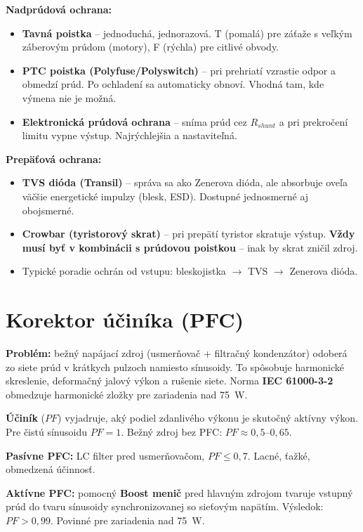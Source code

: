\textbf{Nadprúdová ochrana:}
\begin{itemize}
    \item \textbf{Tavná poistka} -- jednoduchá, jednorazová. T (pomalá) pre záťaže s veľkým záberovým prúdom (motory), F (rýchla) pre citlivé obvody.
    \item \textbf{PTC poistka (Polyfuse/Polyswitch)} -- pri prehriatí vzrastie odpor a obmedzí prúd. Po ochladení sa automaticky obnoví. Vhodná tam, kde výmena nie je možná.
    \item \textbf{Elektronická prúdová ochrana} -- sníma prúd cez $R_{shunt}$ a pri prekročení limitu vypne výstup. Najrýchlejšia a nastaviteľná.
\end{itemize}

\textbf{Prepäťová ochrana:}
\begin{itemize}
    \item \textbf{TVS dióda (Transil)} -- správa sa ako Zenerova dióda, ale absorbuje oveľa väčšie energetické impulzy (blesk, ESD). Dostupné jednosmerné aj obojsmerné.
    \item \textbf{Crowbar (tyristorový skrat)} -- pri prepätí tyristor skratuje výstup. \textbf{Vždy musí byť v kombinácii s prúdovou poistkou} -- inak by skrat zničil zdroj.
    \item Typické poradie ochrán od vstupu: bleskojistka $\to$ TVS $\to$ Zenerova dióda.
\end{itemize}

\section{Korektor účiníka (PFC)}

\textbf{Problém:} bežný napájací zdroj (usmerňovač + filtračný kondenzátor) odoberá zo siete prúd v krátkych pulzoch namiesto sínusoidy. To spôsobuje harmonické skreslenie, deformačný jalový výkon a rušenie siete. Norma \textbf{IEC 61000-3-2} obmedzuje harmonické zložky pre zariadenia nad 75~W.

\textbf{Účiník} ($PF$) vyjadruje, aký podiel zdanlivého výkonu je skutočný aktívny výkon. Pre čistú sínusoidu $PF = 1$. Bežný zdroj bez PFC: $PF \approx 0{,}5$--$0{,}65$.

\textbf{Pasívne PFC:} LC filter pred usmerňovačom, $PF \leq 0{,}7$. Lacné, ťažké, obmedzená účinnosť.

\textbf{Aktívne PFC:} pomocný \textbf{Boost menič} pred hlavným zdrojom tvaruje vstupný prúd do tvaru sínusoidy synchronizovanej so sieťovým napätím. Výsledok: $PF > 0{,}99$. Povinné pre zariadenia nad 75~W.


